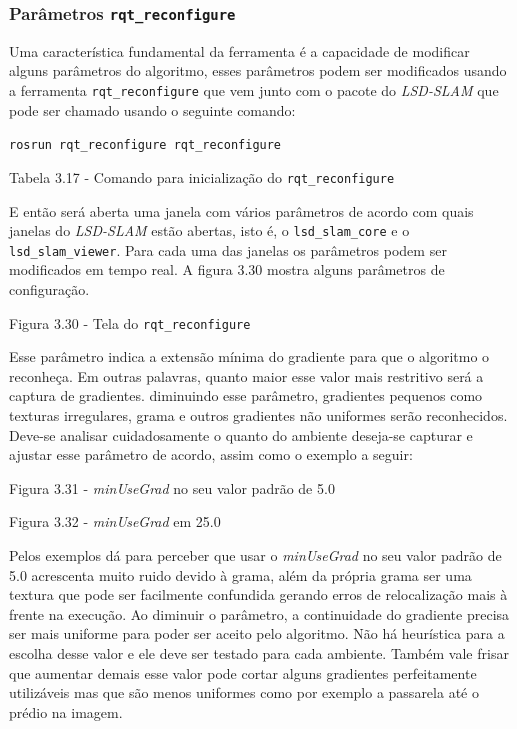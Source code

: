 \subsubsection{Parâmetros \texttt{rqt\_reconfigure}}

Uma característica fundamental da ferramenta é a capacidade de modificar alguns parâmetros do algoritmo, esses parâmetros podem ser modificados usando a ferramenta \texttt{rqt\_reconfigure} que vem junto com o pacote do \textit{LSD-SLAM} que pode ser chamado usando o seguinte comando:

\texttt{rosrun rqt\_reconfigure rqt\_reconfigure}

Tabela 3.17 - Comando para inicialização do \texttt{rqt\_reconfigure}

E então será aberta uma janela com vários parâmetros de acordo com quais janelas do \textit{LSD-SLAM} estão abertas, isto é, o \texttt{lsd\_slam\_core} e o \texttt{lsd\_slam\_viewer}. Para cada uma das janelas os parâmetros podem ser modificados em tempo real. A figura 3.30 mostra alguns parâmetros de configuração.

Figura 3.30 - Tela do \texttt{rqt\_reconfigure}


Esse parâmetro indica a extensão mínima do gradiente para que o algoritmo o reconheça. Em outras palavras, quanto maior esse valor mais restritivo será a captura de gradientes. diminuindo esse parâmetro, gradientes pequenos como texturas irregulares, grama e outros gradientes não uniformes serão reconhecidos. Deve-se analisar cuidadosamente o quanto do ambiente deseja-se capturar e ajustar esse parâmetro de acordo, assim como o exemplo a seguir:


Figura 3.31 - \textit{minUseGrad} no seu valor padrão de 5.0

Figura 3.32 - \textit{minUseGrad} em 25.0

Pelos exemplos dá para perceber que usar o \textit{minUseGrad} no seu valor padrão de 5.0 acrescenta muito ruido devido à grama, além da própria grama ser uma textura que pode ser facilmente confundida gerando erros de relocalização mais à frente na execução. Ao diminuir o parâmetro, a continuidade do gradiente precisa ser mais uniforme para poder ser aceito pelo algoritmo. Não há heurística para a escolha desse valor e ele deve ser testado para cada ambiente. Também vale frisar que aumentar demais esse valor pode cortar alguns gradientes perfeitamente utilizáveis mas que são menos uniformes como por exemplo a passarela até o prédio na imagem.

